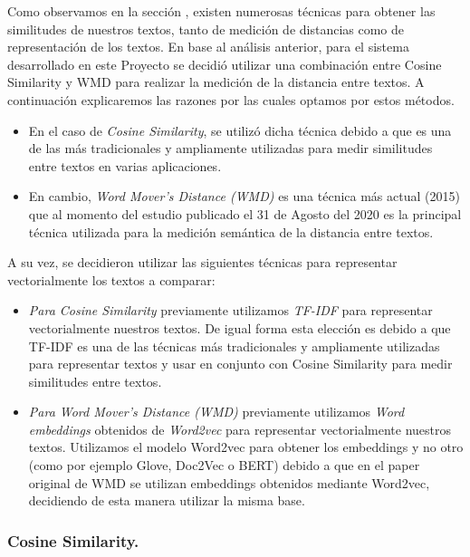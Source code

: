 \documentclass[12pt,a4paper]{article}
\begin{document}
\begin{sloppypar}
Como observamos en la sección \textit{}, existen numerosas técnicas para obtener las similitudes de nuestros textos, tanto de medición de distancias como de representación de los textos. En base al análisis anterior, para el sistema desarrollado en este Proyecto se decidió utilizar una combinación entre Cosine Similarity y WMD para realizar la medición de la distancia entre textos. A continuación explicaremos las razones por las cuales optamos por estos métodos.
\begin{itemize}
\item En el caso de \textit{Cosine Similarity}, se utilizó dicha técnica debido a que es una de las más tradicionales y ampliamente utilizadas para medir similitudes entre textos en varias aplicaciones\cite{similarity_survey, cosine_sim_1, cosine_sim_2, cosine_sim_3}.
\item En cambio, \textit{Word Mover’s Distance (WMD)} es una técnica más actual (2015)\cite{wmd_paper} que al momento del estudio publicado el 31 de Agosto del 2020\cite{similarity_survey} es la principal técnica utilizada para la medición semántica de la distancia entre textos.
\end{itemize}

A su vez, se decidieron utilizar las siguientes técnicas para representar vectorialmente los textos a comparar:
\begin{itemize}
\item \textit{Para Cosine Similarity} previamente utilizamos \textit{TF-IDF} para representar vectorialmente nuestros textos. De igual forma esta elección es debido a que TF-IDF es una de las técnicas más tradicionales y ampliamente utilizadas para representar textos y usar en conjunto con Cosine Similarity para medir similitudes entre textos\cite{similarity_survey}. 
\item \textit{Para Word Mover’s Distance (WMD)} previamente utilizamos \textit{Word embeddings} obtenidos de \textit{Word2vec} para representar vectorialmente nuestros textos. Utilizamos el modelo Word2vec para obtener los embeddings y no otro (como por ejemplo Glove, Doc2Vec o BERT)  debido a que en el paper original de WMD\cite{wmd_paper} se utilizan embeddings obtenidos mediante Word2vec, decidiendo de esta manera utilizar la misma base.
\end{itemize}

\cleardoublepage

\subsubsection{Cosine Similarity.}\label{cosine}


\end{sloppypar}
\end{document}
